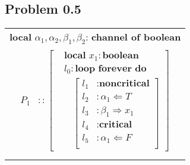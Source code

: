 \documentclass[12pt]{article}
\begin{document}
\subsection*{Problem 0.5}
\begin{center}
\begin{tabular}{|c|}
\hline
\textbf{local} $\alpha_1,\alpha_2,\beta_1,\beta_2$: \textbf{channel of boolean}\\
\parbox{8cm}{\begin{align*}
	P_1 &:: \left[ \begin{aligned}
		&\textbf{local } x_1: \textbf{boolean}\\
		&l_0: \textbf{loop forever do } \\ 
 		&\;\;\; \left[ \begin{aligned}
 				l_1 &: \textbf{noncritical}\\ 
 				l_2 &: \alpha_1 \Leftarrow T\\
 				l_3 &: \beta_1 \Rightarrow x_1\\
 				l_4 &: \textbf{critical}\\
 				l_5 &: \alpha_1 \Leftarrow F\\
			\end{aligned} \right]
		\end{aligned} \right]\\
\end{align*}} \\
$\big{\|}$\\
\parbox{8cm}{\begin{align*}
	A &:: \left[ \begin{aligned}
		&\textbf{local } y: \textbf{boolean}\\
		&k_0: \textbf{loop forever do } \\ 
 		&\;\;k_1: \left[ \begin{aligned}
 				[k_{1}^{a}&: \alpha_1 \Rightarrow y; k_2 \beta_1 \Leftarrow T; k_3: \alpha_1 \Rightarrow y]\\ 
 				& \textbf{or}\\
 				[k_{1}^{b}&: \alpha_2 \Rightarrow y; k_4 \beta_2 \Leftarrow T; k_5: \alpha_2 \Rightarrow y]\\
			\end{aligned} \right]
		\end{aligned} \right]\\
\end{align*}} \\
$\big{\|}$\\
\parbox{8cm}{\begin{align*}

\end{align*}}
\end{tabular}
\end{center}
\end{document}
